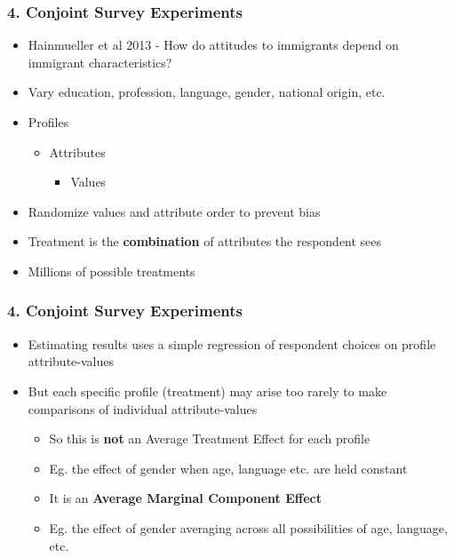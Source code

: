 \documentclass[xcolor=x11names,compress]{beamer}\usepackage[]{graphicx}\usepackage[]{color}
\renewcommand{\(}{\begin{columns}}
\renewcommand{\)}{\end{columns}}
\newcommand{\<}[1]{\begin{column}{#1}}
\renewcommand{\>}{\end{column}}
\begin{document}
\begin{frame}
\frametitle{4. Conjoint Survey Experiments}
\begin{itemize}
\item Hainmueller et al 2013 - How do attitudes to immigrants depend on immigrant characteristics?
\pause
\item Vary education, profession, language, gender, national origin, etc.
\pause
\item Profiles
\begin{itemize}
\item Attributes
\begin{itemize}
\item Values
\end{itemize}
\end{itemize}
\pause
\item Randomize values and attribute order to prevent bias
\pause
\item Treatment is the \textbf{combination} of attributes the respondent sees
\pause
\item Millions of possible treatments
\end{itemize}
\end{frame}





\begin{frame}
\frametitle{4. Conjoint Survey Experiments}
\begin{itemize}
\item Estimating results uses a simple regression of respondent choices on profile attribute-values
\pause
\item But each specific profile (treatment) may arise too rarely to make comparisons of individual attribute-values
\pause
\begin{itemize}
\item So this is \textbf{not} an Average Treatment Effect for each profile
\pause
\item Eg. the effect of gender when age, language etc. are held constant
\pause
\item It is an \textbf{Average Marginal Component Effect}
\pause
\item Eg. the effect of gender averaging across all possibilities of age, language, etc.
\end{itemize}
\end{itemize}
\end{frame}
\end{document}
